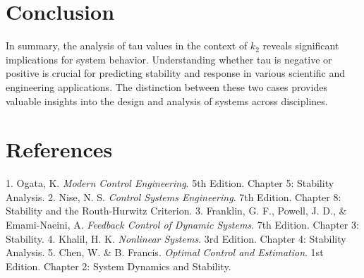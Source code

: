 \documentclass[a4paper]{article}
\begin{document}
\section{Conclusion}
In summary, the analysis of tau values in the context of \( k_2 \) reveals significant implications for system behavior. Understanding whether tau is negative or positive is crucial for predicting stability and response in various scientific and engineering applications. The distinction between these two cases provides valuable insights into the design and analysis of systems across disciplines.

\section{References}
1. Ogata, K. \textit{Modern Control Engineering}. 5th Edition. Chapter 5: Stability Analysis.
2. Nise, N. S. \textit{Control Systems Engineering}. 7th Edition. Chapter 8: Stability and the Routh-Hurwitz Criterion.
3. Franklin, G. F., Powell, J. D., \& Emami-Naeini, A. \textit{Feedback Control of Dynamic Systems}. 7th Edition. Chapter 3: Stability.
4. Khalil, H. K. \textit{Nonlinear Systems}. 3rd Edition. Chapter 4: Stability Analysis.
5. Chen, W. \& B. Francis. \textit{Optimal Control and Estimation}. 1st Edition. Chapter 2: System Dynamics and Stability.
\end{document}
